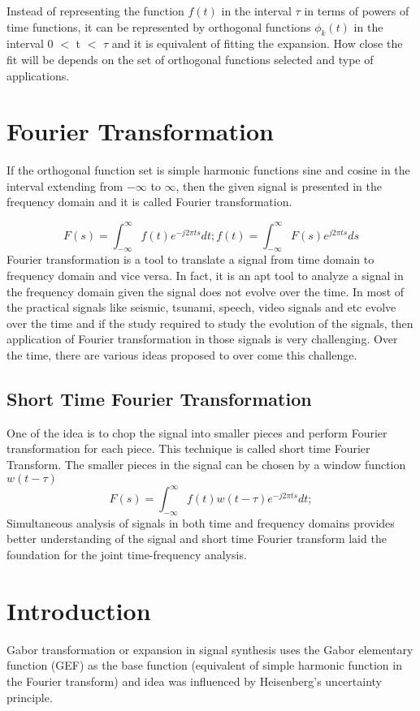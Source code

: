 \documentclass[paper=a4, fontsize=11pt,twoside]{scrartcl}		%
\begin{document}
Instead of representing the function $f(t)$ in the interval $\tau$ in terms of powers of time functions, it can be represented by orthogonal functions ${\phi}_k(t)$ in the interval 0 $<$ t $<$ $\tau$ and it is equivalent of fitting the expansion. How close the fit will be depends on the set of orthogonal functions selected and type of applications.

\section{Fourier Transformation}
If the orthogonal function set is simple harmonic functions sine and cosine in the interval extending from ${-\infty}$ to ${\infty}$, then the given signal is presented in the frequency domain and it is called Fourier transformation.

\begin{equation}
F(s) = \int_{-\infty}^{\infty}{f(t)e^{-j2\pi ts}dt};
f(t) = \int_{-\infty}^{\infty}{F(s)e^{j2\pi ts}ds}
\end{equation}
Fourier transformation is a tool to translate a signal from time domain to frequency domain and vice versa. In fact, it is an apt tool to analyze a signal in the frequency domain given the signal does not evolve over the time. In most of the practical signals like seismic, tsunami, speech, video  signals and etc evolve over the time and if the study required to study the evolution of the signals, then application of Fourier transformation in those signals is very challenging. Over the time, there are various ideas proposed to over come this challenge.
\subsection{Short Time Fourier Transformation}
 One of the idea is to chop the signal into smaller pieces and perform Fourier transformation for each piece. This technique is called short time Fourier Transform. The smaller pieces in the signal can be chosen by a window function $w(t-\tau)$
 \begin{equation}
F(s) = \int_{-\infty}^{\infty}{f(t)w(t-\tau)e^{-j2\pi ts}dt};
\end{equation}
Simultaneous analysis of signals in both time and frequency domains provides better understanding of the signal and short time Fourier transform laid the foundation for the joint time-frequency analysis.
\section{Introduction}
Gabor transformation or expansion in signal synthesis uses the Gabor elementary function (GEF) as the base function (equivalent of simple harmonic function in the Fourier transform) and idea was influenced by Heisenberg's uncertainty principle.  \\
\end{document}
